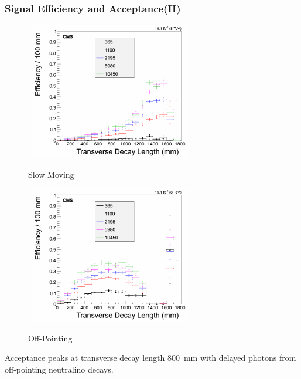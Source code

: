 \documentclass{beamer}
\begin{document}
\begin{frame}
 \frametitle{Signal Efficiency and Acceptance(II)}
\begin{figure}[ht]
\begin{minipage}[b]{0.45\linewidth}
\centering
\mbox{
\includegraphics[height=6cm,width=\textwidth]{THESISPLOTS/Accp_ctbgT1.png}}
\vspace{-1cm}
\caption{Slow Moving}
\end{minipage}
\hspace{0.1cm}
\begin{minipage}[b]{0.45\linewidth}
\centering
\mbox{
\includegraphics[height=6cm, width=\textwidth]{THESISPLOTS/Accp_ctbgT2.png}}
\vspace{-1cm}
\caption{Off-Pointing}
\end{minipage}
\end{figure} 
 Acceptance peaks at transverse decay length 800~mm with delayed photons from off-pointing neutralino decays.
\end{frame}
\end{document}
